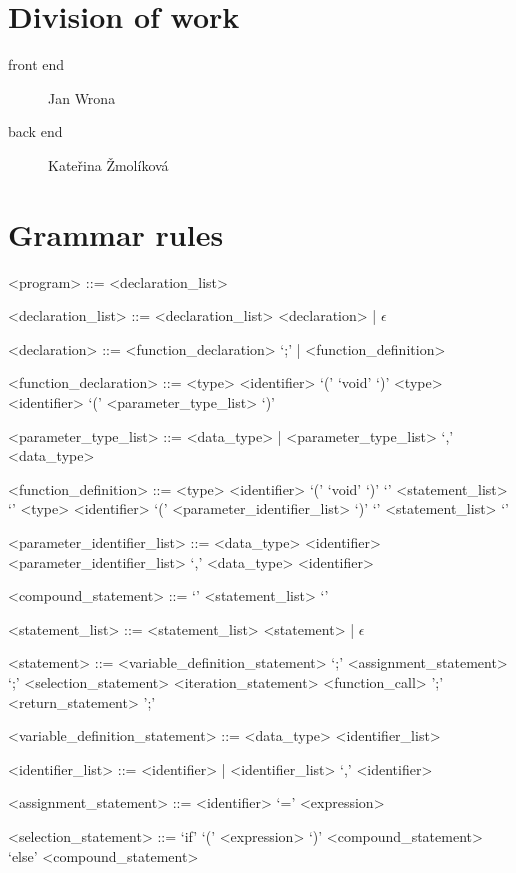 \documentclass[a4paper]{article}[25.12.2015]
\begin{document}
\section{Division of work}
\begin{description}
\item [front end] Jan Wrona
\item [back end] Kateřina Žmolíková
\end{description}

\clearpage
\appendix
\section{Grammar rules} \label{app:grammar}
\begin{grammar}
<program> ::= <declaration_list>

<declaration_list> ::= <declaration_list> <declaration> | $\epsilon$

<declaration> ::= <function_declaration> `;' | <function_definition>

<function_declaration> ::= <type> <identifier> `(' `void' `)'
\alt <type> <identifier> `(' <parameter_type_list> `)'

<parameter_type_list> ::= <data_type> | <parameter_type_list> `,' <data_type>

<function_definition> ::= <type> <identifier> `(' `void' `)' `{' <statement_list> `}'
\alt <type> <identifier> `(' <parameter_identifier_list> `)' `{' <statement_list> `}'

<parameter_identifier_list> ::= <data_type> <identifier>
\alt <parameter_identifier_list> `,' <data_type> <identifier>

<compound_statement> ::= `{' <statement_list> `}'

<statement_list> ::= <statement_list> <statement> | $\epsilon$

<statement> ::= <variable_definition_statement> `;'
\alt <assignment_statement> `;'
\alt <selection_statement>
\alt <iteration_statement>
\alt <function_call> ';'
\alt <return_statement> ';'

<variable_definition_statement> ::= <data_type> <identifier_list>

<identifier_list> ::= <identifier> | <identifier_list> `,' <identifier>

<assignment_statement> ::= <identifier> `=' <expression>

<selection_statement> ::= `if' `(' <expression> `)' <compound_statement> `else' <compound_statement>


\end{grammar}
\end{document}
